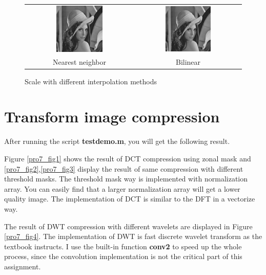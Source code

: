 \documentclass[11pt,a4paper]{article}
\begin{document}
\begin{figure}[!htbp]
	\centering
	\begin{tabular}{cc} 
		\includegraphics[width=0.45\textwidth]{pro6/scale/scale_nn}&
		\includegraphics[width=0.45\textwidth]{pro6/scale/scale_bilinear}\\
		Nearest neighbor &Bilinear 
	\end{tabular}
	\caption{Scale with different interpolation methods}
	\label{pro6_fig7}
\end{figure}

\section{Transform image compression}
After running the script \textbf{testdemo.m}, you will get the following result.

Figure \ref{pro7_fig1} shows the result of DCT compression using zonal mask
and \ref{pro7_fig2},\ref{pro7_fig3} display the result of same compression with different threshold
masks. The threshold mask way is implemented with normalization array.
You can easily find that a larger normalization array will get a lower quality image.
The implementation of DCT is similar to the DFT in a vectorize way.

The result of DWT compression with different wavelets are displayed in Figure \ref{pro7_fig4}.
The implementation of DWT is fast discrete wavelet transform as the textbook instructs.
I use the built-in function \textbf{conv2} to speed up the whole process, since the convolution implementation
is not the critical part of this assignment.
\end{document}

